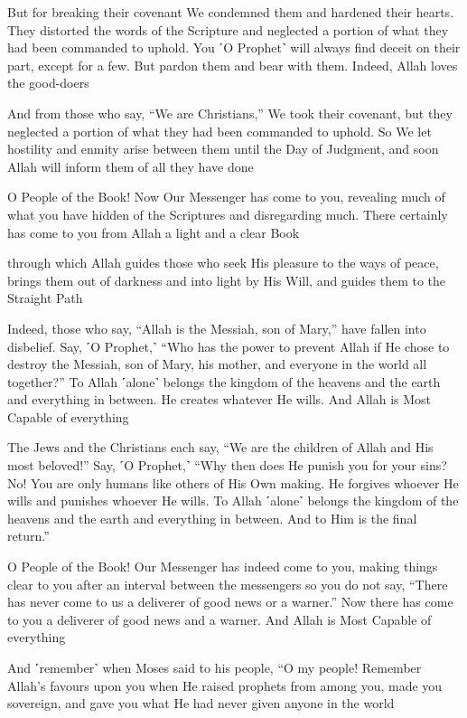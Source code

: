 But for breaking their covenant We condemned them and hardened their hearts. They distorted the words of the Scripture and neglected a portion of what they had been commanded to uphold. You ˹O Prophet˺ will always find deceit on their part, except for a few. But pardon them and bear with them. Indeed, Allah loves the good-doers

And from those who say, “We are Christians,” We took their covenant, but they neglected a portion of what they had been commanded to uphold. So We let hostility and enmity arise between them until the Day of Judgment, and soon Allah will inform them of all they have done

O People of the Book! Now Our Messenger has come to you, revealing much of what you have hidden of the Scriptures and disregarding much. There certainly has come to you from Allah a light and a clear Book

through which Allah guides those who seek His pleasure to the ways of peace, brings them out of darkness and into light by His Will, and guides them to the Straight Path

Indeed, those who say, “Allah is the Messiah, son of Mary,” have fallen into disbelief. Say, ˹O Prophet,˺ “Who has the power to prevent Allah if He chose to destroy the Messiah, son of Mary, his mother, and everyone in the world all together?” To Allah ˹alone˺ belongs the kingdom of the heavens and the earth and everything in between. He creates whatever He wills. And Allah is Most Capable of everything

The Jews and the Christians each say, “We are the children of Allah and His most beloved!” Say, ˹O Prophet,˺ “Why then does He punish you for your sins? No! You are only humans like others of His Own making. He forgives whoever He wills and punishes whoever He wills. To Allah ˹alone˺ belongs the kingdom of the heavens and the earth and everything in between. And to Him is the final return.”

O People of the Book! Our Messenger has indeed come to you, making things clear to you after an interval between the messengers so you do not say, “There has never come to us a deliverer of good news or a warner.” Now there has come to you a deliverer of good news and a warner. And Allah is Most Capable of everything

And ˹remember˺ when Moses said to his people, “O my people! Remember Allah’s favours upon you when He raised prophets from among you, made you sovereign, and gave you what He had never given anyone in the world

